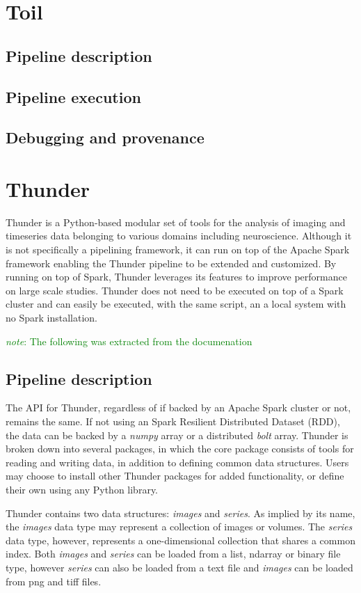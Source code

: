 \documentclass{report}
\newcommand{\note}[1]{\textcolor{green}{\textit{note}: #1}}
\begin{document}
    \section{Toil}
        \subsection{Pipeline description}
        \subsection{Pipeline execution}
        \subsection{Debugging and provenance}
    \section{Thunder}

        Thunder is a Python-based modular set of tools for the analysis of imaging and timeseries data belonging
        to various domains including neuroscience. Although it is not specifically a pipelining framework, 
        it can run on top of the Apache
        Spark framework enabling the Thunder pipeline to be extended and customized. By running on top of Spark,
        Thunder leverages its features to improve performance on large scale studies. Thunder does not need to
        be executed on top of a Spark cluster and can easily be executed, with the same script, an a local system
        with no Spark installation. 

        \note{The following was extracted from the documenation}
        \subsection{Pipeline description}
        The API for Thunder, regardless of if backed by an Apache Spark cluster or not, remains the same. If not 
        using an Spark Resilient Distributed Dataset (RDD), the data can be backed by a \textit{numpy} array or a
        distributed \textit{bolt} array. Thunder is broken down into several packages, in which the core package
        consists of tools for reading and writing data, in addition to defining common data structures. Users may
        choose to install other Thunder packages for added functionality, or define their own using any Python
        library.        
 

        Thunder contains two data structures: \textit{images} and \textit{series}. As implied by its name, the 
        \textit{images} data type may represent a collection of images or volumes. 
        The \textit{series} data type,
        however, represents a one-dimensional collection that shares a common index. Both \textit{images} and 
        \textit{series} can be loaded from a list, ndarray or binary file type, however \textit{series} can also 
        be loaded from a text file and \textit{images} can be loaded from png and tiff files.
\end{document}
